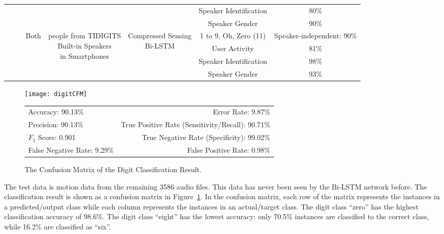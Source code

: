\begin{landscape}
\begin{table}[h]
\begin{tabular}{cccccc}
			&&&&Speaker Identification& 80\%\\ \cline{5-6}
			&&&&Speaker Gender& 90\%\\
			\midrule[0.5pt]
			\multirow{4}{*}{~~~\systemName} & \multirow{4}{*}{Both} & \multirow{4}{*}{\parbox{3.5cm}{ people from TIDIGITS \\Built-in Speakers \\in Smartphones}} & \multirow{4}{*}{\parbox{1.8cm}{\centering Compressed Sensing\\Bi-LSTM} } &1 to 9, Oh, Zero  (11) &Speaker-independent: 90\%\\ \cline{5-6}
			&&&&User Activity& 81\%\\ \cline{5-6}
			&&&&Speaker Identification& 98\%\\ \cline{5-6}
			&&&&Speaker Gender& 93\%\\
			\midrule[0.3pt]\bottomrule[1pt]
		\end{tabular}
	\end{table}
\end{landscape}
\begin{figure}[!h]
	\centering
	\texttt{[image: digitCFM]}
	\centering
		\begin{tabular}{lr}
		\toprule
		Accuracy: 90.13\% & \hspace{-.55in} Error Rate: 9.87\% \\
		Precision: 90.13\% & \hspace{-.55in} True Positive Rate (Sensitivity/Recall): 90.71\% \\
		$F_1$ Score: 0.901 & \hspace{-.55in} True Negative Rate (Specificity): 99.02\% \\
		False Negative Rate: 9.29\%  & \hspace{-.55in} False Positive Rate: 0.98\% \\
		\bottomrule
	\end{tabular}
	\caption{The Confusion Matrix of the Digit Classification Result.
	}
	\label{fig:digitCFM}
\end{figure}
%
The test data is motion data from the remaining 3586 audio files. This data has never been seen by the Bi-LSTM network before. The classification result is shown as a confusion matrix in Figure~\ref{fig:digitCFM}. In the confusion matrix, each row of the matrix represents the instances in a predicted/output class while each column represents the instances in an actual/target class. The digit class ``zero'' has the highest classification accuracy of 98.6\%. The digit class ``eight'' has the lowest accuracy: only 70.5\% instances are classified to the correct class, while 16.2\% are classified as ``six''.
